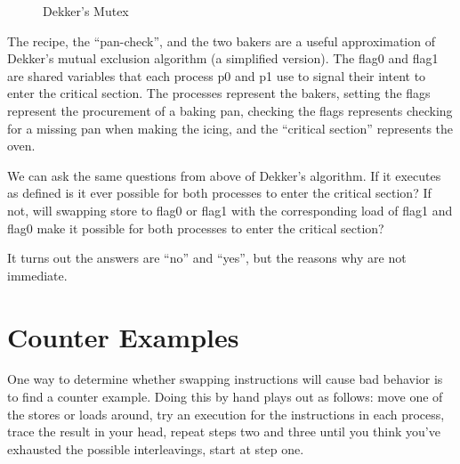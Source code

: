 \documentclass[9pt,twocolumn]{extarticle}
\newcommand{\ttf}[1]{{\ttfamily #1}}
\begin{document}
\begin{figure}[h]
  \vspace{-0.6cm}
  \begin{minipage}{.24\textwidth}
        
  \end{minipage}
  \begin{minipage}{.25\textwidth}
        
      \end{minipage}
  \vspace{-0.25cm}
  \caption{Dekker's Mutex}
  \vspace{-0.25cm}
\end{figure}

The recipe, the ``pan-check'', and the two bakers are a useful approximation of Dekker's mutual exclusion algorithm (a simplified version). The \ttf{flag0} and \ttf{flag1} are shared variables that each process \ttf{p0} and \ttf{p1} use to signal their intent to enter the critical section. The processes represent the bakers, setting the flags represent the procurement of a baking pan, checking the flags represents checking for a missing pan when making the icing, and the ``critical section'' represents the oven.

We can ask the same questions from above of Dekker's algorithm. If it executes as defined is it ever possible for both processes to enter the critical section? If not, will swapping store to \ttf{flag0} or \ttf{flag1} with the corresponding load of \ttf{flag1} and \ttf{flag0} make it possible for both processes to enter the critical section?

It turns out the answers are ``no'' and ``yes'', but the reasons why are not immediate.

\vspace{-0.25cm}
\section{Counter Examples}
\vspace{-0.25cm}
One way to determine whether swapping instructions will cause bad behavior is to find a counter example. Doing this by hand plays out as follows: move one of the stores or loads around, try an execution for the instructions in each process, trace the result in your head, repeat steps two and three until you think you've exhausted the possible interleavings, start at step one.
\end{document}
